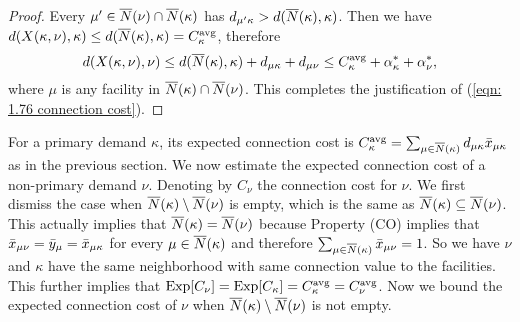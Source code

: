 \begin{proof}
 Every $\mu'\in {\overline{N}}(\nu)\cap {\overline{N}}(\kappa)$
has $d_{\mu'\kappa} > d({\overline{N}}(\kappa),\kappa)$. Then we
have $d(X(\kappa,\nu),\kappa)\leq
d({\overline{N}}(\kappa),\kappa)=C^{{\mbox{\scriptsize\rm avg}}}_{\kappa}$, therefore
\begin{equation*}
  d(X(\kappa,\nu), \nu) \leq d({\overline{N}}(\kappa), \kappa) +
  d_{\mu\kappa} + d_{\mu\nu} \leq C^{{\mbox{\scriptsize\rm avg}}}_{\kappa} +
  \alpha_{\kappa}^\ast + \alpha_{\nu}^\ast,  
\end{equation*}
where $\mu$ is any facility in ${\overline{N}}(\kappa)\cap {\overline{N}}(\nu)$.
This completes the justification of (\ref{eqn: 1.76
  connection cost}).
\end{proof}

For a primary demand $\kappa$, its expected connection cost
is $C^{\mbox{\scriptsize\rm avg}}_{\kappa} = \sum_{\mu\in{\overline{N}}(\kappa)}
d_{\mu\kappa}{\bar x}_{\mu\kappa}$ as in the previous section.
We now estimate the expected connection cost of a
non-primary demand $\nu$. Denoting by $C_\nu$ the connection
cost for $\nu$. We first dismiss the case when
${\overline{N}}(\kappa)\setminus {\overline{N}}(\nu)$ is empty, which is the
same as ${\overline{N}}(\kappa) \subseteq {\overline{N}}(\nu)$. This
actually implies that ${\overline{N}}(\kappa) = {\overline{N}}(\nu)$ because
Property (CO) implies that ${\bar x}_{\mu\nu} = {\bar y}_{\mu} =
{\bar x}_{\mu\kappa}$ for every $\mu \in {\overline{N}}(\kappa)$ and
therefore $\sum_{\mu\in{\overline{N}}(\kappa)} {\bar x}_{\mu\nu} =
1$. So we have $\nu$ and $\kappa$ have the same neighborhood
with same connection value to the facilities. This further
implies that $\mbox{\rm Exp}[C_{\nu}] = \mbox{\rm Exp}[C_{\kappa}] =
C^{{\mbox{\scriptsize\rm avg}}}_{\kappa} = C^{{\mbox{\scriptsize\rm avg}}}_{\nu}$. Now we bound the
expected connection cost of $\nu$ when
${\overline{N}}(\kappa)\setminus {\overline{N}}(\nu)$ is not empty.

